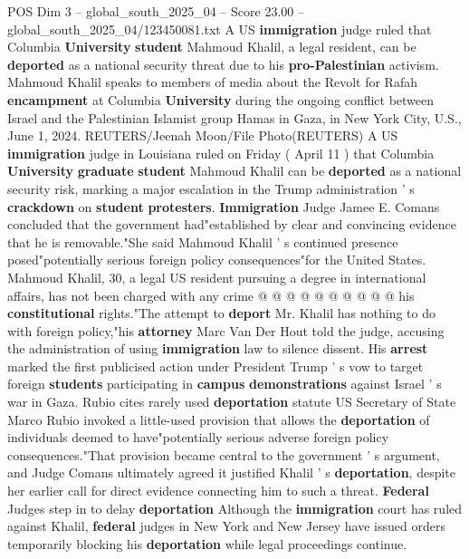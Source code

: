 \begin{textsample}{POS Dim 3 – global\_south\_2025\_04 – Score 23.00 – global\_south\_2025\_04/123450081.txt}  \label{ex:f3_pos_116}
A US \textbf{immigration} judge ruled that Columbia \textbf{University} \textbf{student} Mahmoud Khalil, a legal resident, can be \textbf{deported} as a national security threat due to his \textbf{pro-Palestinian} activism.
Mahmoud Khalil speaks to members of media about the Revolt for Rafah \textbf{encampment} at Columbia \textbf{University} during the ongoing conflict between Israel and the Palestinian Islamist group Hamas in Gaza, in New York City, U.S., June 1, 2024.
REUTERS/Jeenah Moon/File Photo(REUTERS) A US \textbf{immigration} judge in Louisiana ruled on Friday ( April 11 ) that Columbia \textbf{University} \textbf{graduate} \textbf{student} Mahmoud Khalil can be \textbf{deported} as a national security risk, marking a major escalation in the Trump administration ' s \textbf{crackdown} on \textbf{student} \textbf{protesters}. \textbf{Immigration} Judge Jamee E.
Comans concluded that the government had"established by clear and convincing evidence that he is removable."She said Mahmoud Khalil ' s continued presence posed"potentially serious foreign policy consequences"for the United States.
Mahmoud Khalil, 30, a legal US resident pursuing a degree in international affairs, has not been charged with any crime @ @ @ @ @ @ @ @ @ @ his \textbf{constitutional} rights."The attempt to \textbf{deport} Mr.
Khalil has nothing to do with foreign policy,"his \textbf{attorney} Marc Van Der Hout told the judge, accusing the administration of using \textbf{immigration} law to silence dissent.
His \textbf{arrest} marked the first publicised action under President Trump ' s vow to target foreign \textbf{students} participating in \textbf{campus} \textbf{demonstrations} against Israel ' s war in Gaza.
Rubio cites rarely used \textbf{deportation} statute US Secretary of State Marco Rubio invoked a little-used provision that allows the \textbf{deportation} of individuals deemed to have"potentially serious adverse foreign policy consequences."That provision became central to the government ' s argument, and Judge Comans ultimately agreed it justified Khalil ' s \textbf{deportation}, despite her earlier call for direct evidence connecting him to such a threat. \textbf{Federal} Judges step in to delay \textbf{deportation} Although the \textbf{immigration} court has ruled against Khalil, \textbf{federal} judges in New York and New Jersey have issued orders temporarily blocking his \textbf{deportation} while legal proceedings continue.

\end{textsample}
